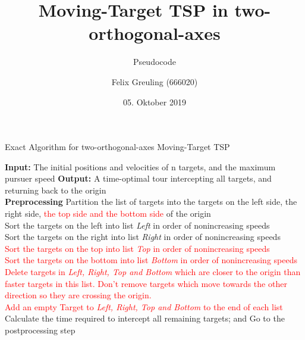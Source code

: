 \documentclass{scrartcl}
\title{Moving-Target TSP in two-orthogonal-axes}
\subtitle{Pseudocode}
\author{Felix Greuling (666020)}
\date{05. Oktober 2019}
\begin{document}
\maketitle


\begin{minipage}{1\linewidth}
\begin{algorithm}[H]
\caption{Exact Algorithm for two-orthogonal-axes Moving-Target TSP}
\begin{algorithmic}
\State \textbf{Input:} The initial positions and velocities of n targets, and the maximum pursuer speed
\State \textbf{Output:} A time-optimal tour intercepting all targets, and returning back to the origin
~ \\
\State \textbf{Preprocessing}
\State Partition the list of targets into the targets on the left side, the right side, \textcolor{red}{the top side and the bottom side} of the origin \\
Sort the targets on the left into list \emph{Left} in order of nonincreasing speeds \\
Sort the targets on the right into list \emph{Right} in order of nonincreasing speeds \\
\textcolor{red}{Sort the targets on the top into list \emph{Top} in order of nonincreasing speeds }\\
\textcolor{red}{Sort the targets on the bottom into list \emph{Bottom} in order of nonincreasing speeds}\\
\textcolor{red}{Delete targets in \emph{Left, Right, Top and Bottom} which are closer to the origin than faster targets in this list. Don't remove targets which move towards the other direction so they are crossing the origin.} \\
\textcolor{red}{Add an empty Target to \emph{Left, Right, Top and Bottom} to the end of each list}
\\
\If {\textcolor{red}{3 of the 4 lists are empty}}
\State Calculate the time required to intercept all remaining targets; and 
\State Go to the postprocessing step
\EndIf

\end{algorithmic}
\end{algorithm}
\end{minipage}
\end{document}
